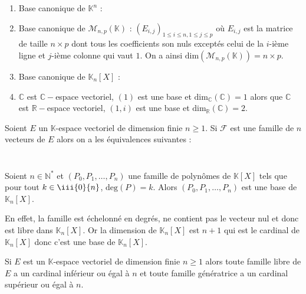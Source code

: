 \documentclass[french,11pt,twoside]{VcCours}
\begin{document}
 \begin{Exemples}
\begin{enumerate}
 \item Base canonique de $\mathbb{K}^n$ : 
 
 \item Base canonique de $\mathcal{M}_{n,p}(\mathbb{K})$ : $(E_{i,j})_{1 \leq i \leq n, 1 \leq j \leq p}$ où $E_{i,j}$ est la matrice de taille $n \times p$ dont tous les coefficients son nuls exceptés celui de la $i$-ième ligne et $j$-ième colonne qui vaut $1$. On a ainsi $\textrm{dim}(\mathcal{M}_{n,p}(\mathbb{K}))=n \times p$.
 \item Base canonique de $\mathbb{K}_n[X]$ : 
 
 \item $\mathbb{C}$ est $\mathbb{C}-$espace vectoriel, $(1)$ est une base et $\textrm{dim}_{\mathbb{C}}(\mathbb{C})=1$ alors que $\mathbb{C}$ est $\mathbb{R}-$espace vectoriel, $(1,i)$ est une base et $\textrm{dim}_{\mathbb{R}}(\mathbb{C})=2$.
 \end{enumerate}
\end{Exemples}
 
 \begin{Proposition}{}
 Soient $E$ un $\mathbb{K}$-espace vectoriel de dimension finie $n \geq 1$. Si $\mathcal{F}$ est une famille de $n$ vecteurs de $E$ alors on a les équivalences suivantes : 
$$ \phantom{\mathcal{F} \hbox{ est une base de E} \Longleftrightarrow \mathcal{F} \hbox{ est libre } \Longleftrightarrow \mathcal{F} \hbox{ est génératrice de E }}$$
\end{Proposition}

\begin{Exemple} Soient $n \in \mathbb{N}^*$ et $(P_0,P_1, \ldots, P_n)$ une famille de polynômes de $\mathbb{K}[X]$ tels que pour tout $k \in \iii{0}{n}$, $\textrm{deg}(P) = k$. Alors $(P_0,P_1, \ldots, P_n)$ est une base de $\mathbb{K}_n[X]$.

En effet, la famille est échelonné en degrés, ne contient pas le vecteur nul et donc est libre dans $\mathbb{K}_n[X]$. Or la dimension de $\mathbb{K}_n[X]$ est $n+1$ qui est le cardinal de $\mathbb{K}_n[X]$ donc c'est une base de $\mathbb{K}_n[X]$.
\end{Exemple}

\medskip

\begin{Remarque}{} Si $E$ est un $\mathbb{K}$-espace vectoriel de dimension finie $n \geq 1$ alors toute famille libre de $E$ a un cardinal inférieur ou égal à $n$ et toute famille génératrice a un cardinal supérieur ou égal à $n$.
\end{Remarque}
\end{document}
